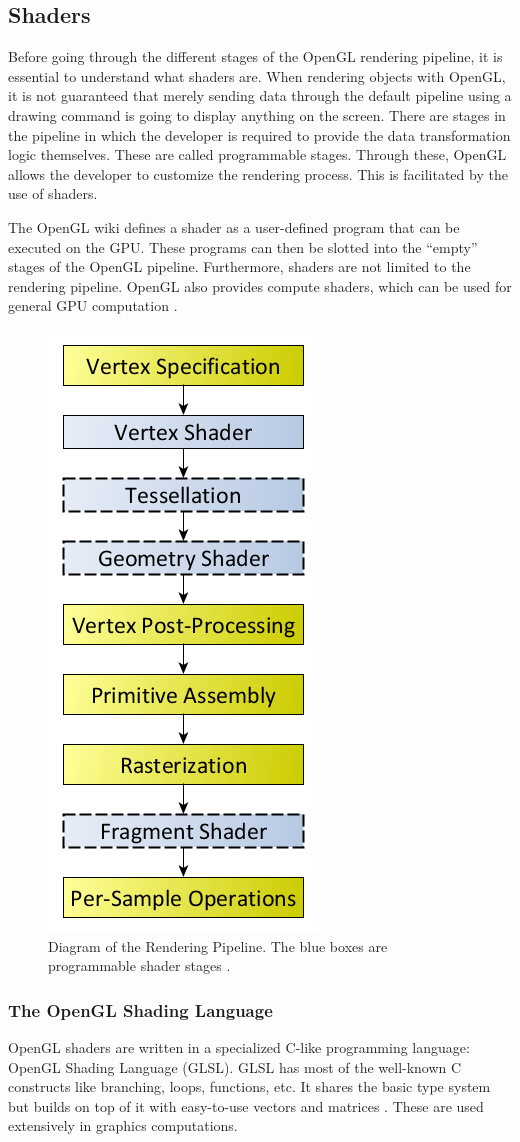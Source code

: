 \documentclass[
  digital,     %
  oneside,     %
  nosansbold,  %
  nocolorbold, %
  lof,         %
  lot,         %
]{fithesis4}
\begin{document}
\subsection{Shaders}
Before going through the different stages of the OpenGL rendering pipeline, it is essential to
understand what shaders are. When rendering objects with OpenGL, it is not guaranteed that
merely sending data through the default pipeline using a drawing command is going to display
anything on the screen. There are stages in the pipeline in which the developer is required to provide the data transformation
logic themselves. These are called programmable stages. Through these, OpenGL allows
the developer to customize the rendering process. This is facilitated by the use of shaders.

The OpenGL wiki defines a shader as a user-defined program that can be executed on the GPU.
These programs can then be slotted into the \enquote{empty} stages of the OpenGL pipeline.
Furthermore, shaders are not limited to the rendering pipeline.
OpenGL also provides compute shaders, which can be used for general GPU computation \cite{openglwiki-shader}.

\begin{figure}
    \centering
    \includegraphics[height=0.75\linewidth]{images/RenderingPipeline.png}
    \caption{Diagram of the Rendering Pipeline. The blue boxes are programmable shader stages
    \cite{openglwiki-rendering-pipeline}.}
    \label{fig:rendering-pipeline}
\end{figure}

\subsubsection{The OpenGL Shading Language}
OpenGL shaders are written in a specialized C-like programming language: OpenGL Shading
Language (GLSL). GLSL has most of the well-known C constructs like branching, loops, functions, etc.
It shares the basic type system but builds on top of it with easy-to-use vectors and matrices \cite{openglwiki-glsl}.
These are used extensively in graphics computations.
\end{document}
